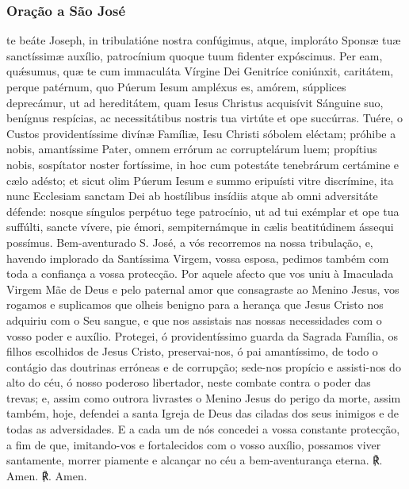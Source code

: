 \subsubsection{Oração a São José}
\begin{paracol}{2}
 te beáte Joseph, in tribulatióne nostra confúgimus, atque, imploráto Sponsæ tuæ sanctíssimæ auxílio, patrocínium quoque tuum fidenter expóscimus. Per eam, quǽsumus, quæ te cum immaculáta Vírgine Dei Genitríce coniúnxit, caritátem, perque patérnum, quo Púerum Iesum ampléxus es, amórem, súpplices deprecámur, ut ad hereditátem, quam Iesus Christus acquisívit Sánguine suo, benígnus respícias, ac necessitátibus nostris tua virtúte et ope succúrras. Tuére, o Custos providentíssime divínæ Famíliæ, Iesu Christi sóbolem eléctam; próhibe a nobis, amantíssime Pater, omnem errórum ac corruptelárum luem; propítius nobis, sospítator noster fortíssime, in hoc cum potestáte tenebrárum certámine e cælo adésto; et sicut olim Púerum Iesum e summo eripuísti vitre discrímine, ita nunc Ecclesiam sanctam Dei ab hostílibus insídiis atque ab omni adversitáte défende: nosque síngulos perpétuo tege patrocínio, ut ad tui exémplar et ope tua suffúlti, sancte vívere, pie émori, sempiternámque in cælis beatitúdinem ássequi possímus.
\switchcolumn
{} Bem-aventurado S. José, a vós recorremos na nossa tribulação, e, havendo implorado da Santíssima Virgem, vossa esposa, pedimos também com toda a confiança a vossa protecção. Por aquele afecto que vos uniu à Imaculada Virgem Mãe de Deus e pelo paternal amor que consagraste ao Menino Jesus, vos rogamos e suplicamos que olheis benigno para a herança que Jesus Cristo nos adquiriu com o Seu sangue, e que nos assistais nas nossas necessidades com o vosso poder e auxílio. Protegei, ó providentíssimo guarda da Sagrada Família, os filhos escolhidos de Jesus Cristo, preservai-nos, ó pai amantíssimo, de todo o contágio das doutrinas erróneas e de corrupção; sede-nos propício e assisti-nos do alto do céu, ó nosso poderoso libertador, neste combate contra o poder das trevas; e, assim como outrora livrastes o Menino Jesus do perigo da morte, assim também, hoje, defendei a santa Igreja de Deus das ciladas dos seus inimigos e de todas as adversidades. E a cada um de nós concedei a vossa constante protecção, a fim de que, imitando-vos e fortalecidos com o vosso auxílio, possamos viver santamente, morrer piamente e alcançar no céu a bem-aventurança eterna.
\switchcolumn*
℟. Amen.
\switchcolumn
℟. Amen.
\end{paracol}

